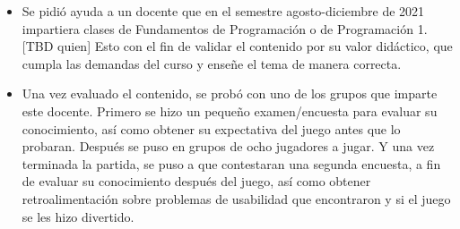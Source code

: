 \begin{itemize}
    \item Se pidió ayuda a un docente que en el semestre agosto-diciembre de 2021 impartiera clases de Fundamentos de Programación o de Programación 1. [TBD quien] Esto con el fin de validar el contenido por su valor didáctico, que cumpla las demandas del curso y enseñe el tema de manera correcta.
    \item Una vez evaluado el contenido, se probó con uno de los grupos que imparte este docente. Primero se hizo un pequeño examen/encuesta para evaluar su conocimiento, así como obtener su expectativa del juego antes que lo probaran. Después se puso en grupos de ocho jugadores a jugar. Y una vez terminada la partida, se puso a que contestaran una segunda encuesta, a fin de evaluar su conocimiento después del juego, así como obtener retroalimentación sobre problemas de usabilidad que encontraron y si el juego se les hizo divertido.
\end{itemize}

